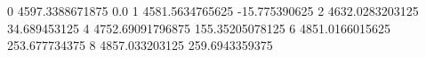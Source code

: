 0 4597.3388671875 0.0
1 4581.5634765625 -15.775390625
2 4632.0283203125 34.689453125
4 4752.69091796875 155.35205078125
6 4851.0166015625 253.677734375
8 4857.033203125 259.6943359375
